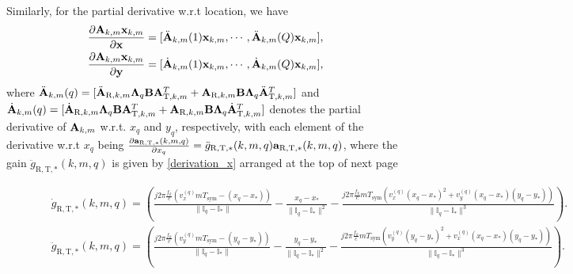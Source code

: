 \documentclass[9pt,final,journal,twocolumn]{IEEEtran}
\begin{document}
Similarly, for the partial derivative w.r.t location, we have 
\begin{subequations} \label{Derivation_loc.}
\begin{align} 
  \frac{\partial{\bf A}_{k,m}{\bf x}_{k,m}}{\partial{\bf x}} &=[\ddot{\bf A}_{k,m}(1){\bf x}_{k,m},\cdots,\ddot{\bf A}_{k,m}(Q){\bf x}_{k,m}], \label{Derivation_loc.1}\\
  \frac{\partial{\bf A}_{k,m}{\bf x}_{k,m}}{\partial{\bf y}} & =[\dot{\bf A}_{k,m}(1){\bf x}_{k,m},\cdots,\dot{\bf A}_{k,m}(Q){\bf x}_{k,m}], \label{Derivation_loc.2}
\end{align}
\end{subequations}
where $\ddot{\bf A}_{k,m}(q)=[{\ddot{\bf A}_{\mathrm{R},k,m}}{\bf \Lambda}_{q} {\bf B}{\bf A}_{\mathrm{T},k,m}^T+{\bf A}_{\mathrm{R},k,m}{\bf B}{\bf \Lambda}_{q}{\ddot{\bf A}_{\mathrm{T},k,m}^T}]$ and $\dot{\bf A}_{k,m}(q)=[{\dot{\bf A}_{\mathrm{R},k,m}}{\bf \Lambda}_{q} {\bf B}{\bf A}_{\mathrm{T},k,m}^T+{\bf A}_{\mathrm{R},k,m}{\bf B}{\bf \Lambda}_{q}{\dot{\bf A}_{\mathrm{T},k,m}^T}]$ denotes the partial derivative of ${\bf A}_{k,m}$ w.r.t. $x_q$ and $y_q$, respectively, with each element of the derivative w.r.t $x_q$ being $\frac{\partial{\bf a}_{\mathrm{R},\mathrm{T},\ast}(k,m,q) }{\partial{x_q}}= \ddot{g}_{\mathrm{R},\mathrm{T},\ast}(k,m,q) {\bf a}_{\mathrm{R},\mathrm{T},\ast}(k,m,q)$, where the gain $\ddot{g}_{\mathrm{R},\mathrm{T},\ast}(k,m,q)$ is given by \eqref{derivation_x} arranged at the top of next page
\begin{figure}[!t]
\begin{subequations} \label{derivation_x}
\begin{flalign} 
  &\dot{g}_{\mathrm{R},\mathrm{T},\ast}(k,m,q) \!=\!(\frac{j2\pi\frac{f_k}{c}(v_{x}^{(q)}mT_{\mathrm{sym}}\!-\!(x_q\!-\!{x}_{\ast}))}{\|{\mathbb I}_{q}-{\mathbb I}_{\ast}\|}-\frac{{x}_q-{x}_{\ast}}{{\|{\mathbb I}_{q}-{\mathbb I}_{\ast}\|^2}} -\frac{j2\pi\frac{f_k}{c}mT_{\mathrm{sym}}(v_{x}^{(q)}({x}_q-{x}_{\ast})^2\!+\!v_{y}^{(q)}({x}_q\!-\!{x}_{\ast})({y}_q\!-\!{y}_{\ast}))}{\|{\mathbb I}_{q}-{\mathbb I}_{\ast}\|^3}). & \\
  &\ddot{g}_{\mathrm{R},\mathrm{T},\ast}(k,m,q) \!=\!(\frac{j2\pi\frac{f_k}{c}(v_{y}^{(q)}mT_{\mathrm{sym}}\!-\!(y_q\!-\!{y}_{\ast}))}{\|{\mathbb I}_{q}-{\mathbb I}_{\ast}\|}-\frac{{y}_q-{y}_{\ast}}{{\|{\mathbb I}_{q}-{\mathbb I}_{\ast}\|^2}} -\frac{j2\pi\frac{f_k}{c}mT_{\mathrm{sym}}(v_{y}^{(q)}({y}_q-{y}_{\ast})^2\!+\!v_{x}^{(q)}({x}_q\!-\!{x}_{\ast})({y}_q\!-\!{y}_{\ast}))}{\|{\mathbb I}_{q}-{\mathbb I}_{\ast}\|^3}). &  
\end{flalign}
\end{subequations}
\hrulefill
\end{figure}
\end{document}
